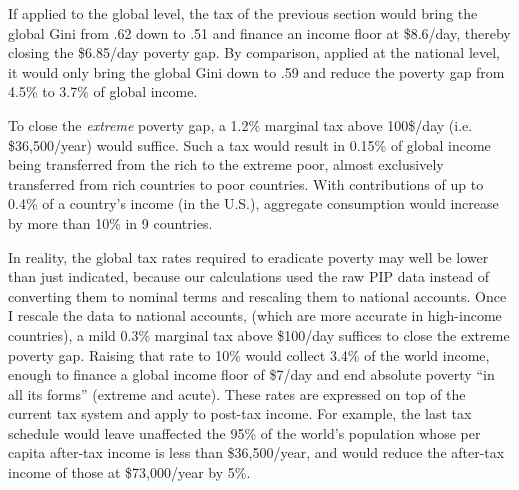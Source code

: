 If applied to the global level, the tax of the previous section would bring the global Gini from .62 down to .51 and finance an income floor at \$8.6/day, thereby closing the \$6.85/day poverty gap. By comparison, applied at the national level, it would only bring the global Gini down to .59 and reduce the poverty gap from 4.5\% to 3.7\% of global income. 

To close the \textit{extreme} poverty gap, a 1.2\% marginal tax %
above 100\$/day (i.e. \$36,500/year) would suffice. %
Such a tax would result in 0.15\% of global income being transferred from the rich to the extreme poor, almost exclusively transferred from rich countries to poor countries. 
With contributions of up to 0.4\% of a country's income (in the U.S.), aggregate consumption would increase by more than 10\% in 9 countries. 

In reality, the global tax rates required to eradicate poverty may well be lower than just indicated, because our calculations used the raw PIP data instead of converting them to nominal terms and rescaling them to national accounts. Once I rescale the data to national accounts, (which are more accurate in high-income countries), 
a mild 0.3\% marginal tax above \$100/day suffices to close the extreme poverty gap. Raising that rate to 10\% would collect 3.4\% of the world income, enough to finance a global income floor of \$7/day and end absolute poverty ``in all its forms'' (extreme and acute). %
These rates are expressed on top of the current tax system and apply to post-tax income. For example, the last tax schedule would leave unaffected the 95\% of the world's population whose per capita after-tax income is less than \$36,500/year, and would reduce the after-tax income of those at \$73,000/year by 5\%. 

